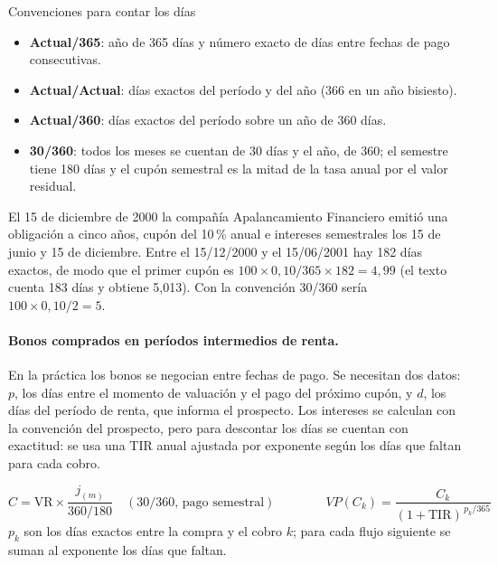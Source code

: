 \begin{definicion}{Convenciones para contar los días}
\begin{itemize}
\item \textbf{Actual/365}: año de 365 días y número exacto de días entre fechas de pago consecutivas.
\item \textbf{Actual/Actual}: días exactos del período y del año (366 en un año bisiesto).
\item \textbf{Actual/360}: días exactos del período sobre un año de 360 días.
\item \textbf{30/360}: todos los meses se cuentan de 30 días y el año, de 360; el semestre tiene 180 días y el cupón semestral es la mitad de la tasa anual por el valor residual.
\end{itemize}
\end{definicion}

\begin{ejemplo}
El 15 de diciembre de 2000 la compañía Apalancamiento Financiero emitió una obligación a cinco años, cupón del 10\,\% anual e intereses semestrales los 15 de junio y 15 de diciembre. Entre el 15/12/2000 y el 15/06/2001 hay 182 días exactos, de modo que el primer cupón es $100\times 0{,}10/365\times 182 = 4{,}99$ (el texto cuenta 183 días y obtiene 5,013). Con la convención 30/360 sería $100\times 0{,}10/2 = 5$.
\end{ejemplo}

\paragraph{Bonos comprados en períodos intermedios de renta.} En la práctica los bonos se negocian entre fechas de pago. Se necesitan dos datos: $p$, los días entre el momento de valuación y el pago del próximo cupón, y $d$, los días del período de renta, que informa el prospecto. Los intereses se calculan con la convención del prospecto, pero para descontar los días se cuentan con exactitud: se usa una TIR anual ajustada por exponente según los días que faltan para cada cobro.

\begin{formulaBox}
\[
C = \text{VR}\times\frac{j_{(m)}}{360/180} \quad(\text{30/360, pago semestral})
\qquad\qquad
VP(C_k) = \frac{C_k}{(1+\text{TIR})^{\,p_k/365}}
\]
$p_k$ son los días exactos entre la compra y el cobro $k$; para cada flujo siguiente se suman al exponente los días que faltan.
\end{formulaBox}

